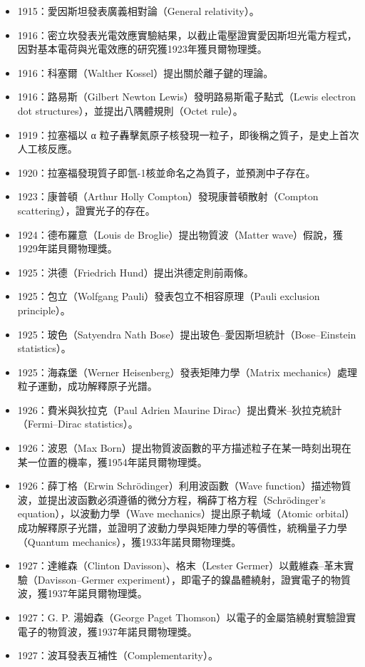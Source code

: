 \documentclass[a4paper,12pt]{article}
\begin{document}
\begin{itemize}
\item 1915：愛因斯坦發表廣義相對論（General relativity）。
\item 1916：密立坎發表光電效應實驗結果，以截止電壓證實愛因斯坦光電方程式，因對基本電荷與光電效應的研究獲1923年獲貝爾物理獎。
\item 1916：科塞爾（Walther Kossel）提出關於離子鍵的理論。
\item 1916：路易斯（Gilbert Newton Lewis）發明路易斯電子點式（Lewis electron dot structures），並提出八隅體規則（Octet rule）。
\item 1919：拉塞福以 α 粒子轟擊氮原子核發現一粒子，即後稱之質子，是史上首次人工核反應。
\item 1920：拉塞福發現質子即氫-1核並命名之為質子，並預測中子存在。
\item 1923：康普頓（Arthur Holly Compton）發現康普頓散射（Compton scattering），證實光子的存在。
\item 1924：德布羅意（Louis de Broglie）提出物質波（Matter wave）假說，獲1929年諾貝爾物理獎。
\item 1925：洪德（Friedrich Hund）提出洪德定則前兩條。
\item 1925：包立（Wolfgang Pauli）發表包立不相容原理（Pauli exclusion principle）。
\item 1925：玻色（Satyendra Nath Bose）提出玻色–愛因斯坦統計（Bose–Einstein statistics）。
\item 1925：海森堡（Werner Heisenberg）發表矩陣力學（Matrix mechanics）處理粒子運動，成功解釋原子光譜。
\item 1926：費米與狄拉克（Paul Adrien Maurine Dirac）提出費米–狄拉克統計（Fermi–Dirac statistics）。
\item 1926：波恩（Max Born）提出物質波函數的平方描述粒子在某一時刻出現在某一位置的機率，獲1954年諾貝爾物理獎。
\item 1926：薛丁格（Erwin Schrödinger）利用波函數（Wave function）描述物質波，並提出波函數必須遵循的微分方程，稱薛丁格方程（Schrödinger's equation），以波動力學（Wave mechanics）提出原子軌域（Atomic orbital）成功解釋原子光譜，並證明了波動力學與矩陣力學的等價性，統稱量子力學（Quantum mechanics），獲1933年諾貝爾物理獎。
\item 1927：達維森（Clinton Davisson)、格末（Lester Germer）以戴維森–革末實驗（Davisson–Germer experiment），即電子的鎳晶體繞射，證實電子的物質波，獲1937年諾貝爾物理獎。
\item 1927：G. P. 湯姆森（George Paget Thomson）以電子的金屬箔繞射實驗證實電子的物質波，獲1937年諾貝爾物理獎。
\item 1927：波耳發表互補性（Complementarity）。

\end{itemize}
\end{document}
